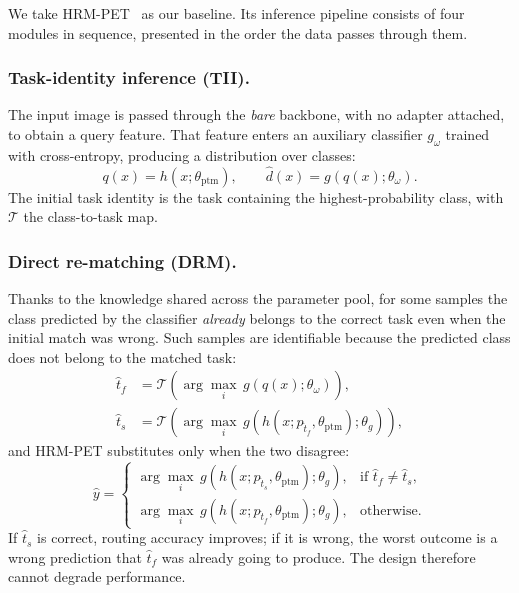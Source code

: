 \documentclass[runningheads]{llncs}
\begin{document}
We take HRM-PET~\cite{ref_hrmpet} as our baseline. Its inference pipeline
consists of four modules in sequence, presented in the order the data passes
through them.

\subsubsection{Task-identity inference (TII).}
The input image is passed through the \emph{bare} backbone, with no adapter
attached, to obtain a query feature. That feature enters an auxiliary classifier
$g_\omega$ trained with cross-entropy, producing a distribution over classes:
\begin{equation}
q(x) = h(x;\theta_{\mathrm{ptm}}),
\qquad
\hat{d}(x) = g\!\left(q(x); \theta_\omega\right).
\label{eq:tii}
\end{equation}
The initial task identity is the task containing the highest-probability class,
with $\mathcal{T}$ the class-to-task map.

\subsubsection{Direct re-matching (DRM).}
Thanks to the knowledge shared across the parameter pool, for some samples the
class predicted by the classifier \emph{already} belongs to the correct task
even when the initial match was wrong. Such samples are identifiable because the
predicted class does not belong to the matched task:
\begin{align}
\hat{t}_f &= \mathcal{T}\!\left(\arg\max_i\, g(q(x);\theta_\omega)\right),
\label{eq:tf}\\
\hat{t}_s &= \mathcal{T}\!\left(\arg\max_i\,
   g\!\left(h(x; p_{\hat{t}_f}, \theta_{\mathrm{ptm}}); \theta_g\right)\right),
\label{eq:ts}
\end{align}
and HRM-PET substitutes only when the two disagree:
\begin{equation}
\hat{y} =
\begin{cases}
\arg\max_i\, g\!\left(h(x; p_{\hat{t}_s}, \theta_{\mathrm{ptm}}); \theta_g\right),
  & \text{if } \hat{t}_f \neq \hat{t}_s,\\[2pt]
\arg\max_i\, g\!\left(h(x; p_{\hat{t}_f}, \theta_{\mathrm{ptm}}); \theta_g\right),
  & \text{otherwise.}
\end{cases}
\label{eq:drm}
\end{equation}
If $\hat{t}_s$ is correct, routing accuracy improves; if it is wrong, the worst
outcome is a wrong prediction that $\hat{t}_f$ was already going to produce. The
design therefore cannot degrade performance.
\end{document}
